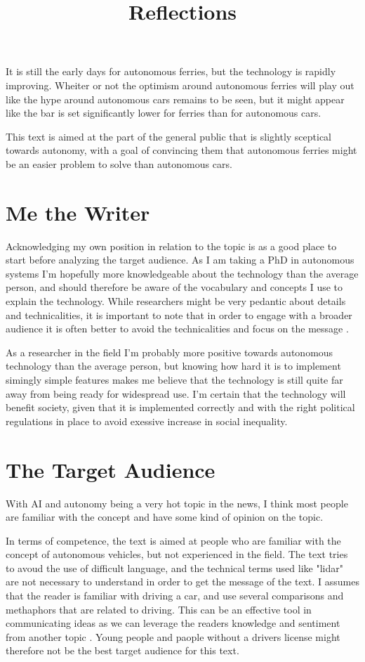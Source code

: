 \documentclass{iopconfser}
\begin{document}
It is still the early days for autonomous ferries, but the technology is rapidly improving. 
Wheiter or not the optimism around autonomous ferries will play out like the hype around autonomous cars remains to be seen, but it might appear like the bar is set significantly lower for ferries than for autonomous cars.


\newpage
\title{Reflections}
This text is aimed at the part of the general public that is slightly sceptical towards autonomy, with a goal of convincing them that autonomous ferries might be an easier problem to solve than autonomous cars.

\section*{Me the Writer}
Acknowledging my own position in relation to the topic is as a good place to start before analyzing the target audience.
As I am taking a PhD in autonomous systems I'm hopefully more knowledgeable about the technology than the average person, and should therefore be aware of the vocabulary and concepts I use to explain the technology.
While researchers might be very pedantic about details and technicalities, it is important to note that in order to engage with a broader audience it is often better to avoid the technicalities and focus on the message \cite{kulykPeopleWantReassurance2023}.

As a researcher in the field I'm probably more positive towards autonomous technology than the average person, but knowing how hard it is to implement simingly simple features makes me believe that the technology is still quite far away from being ready for widespread use.
I'm certain that the technology will benefit society, given that it is implemented correctly and with the right political regulations in place to avoid exessive increase in social inequality.

\section*{The Target Audience}
With AI and autonomy being a very hot topic in the news, I think most people are familiar with the concept and have some kind of opinion on the topic.

In terms of competence, the text is aimed at people who are familiar with the concept of autonomous vehicles, but not experienced in the field.
The text tries to avoud the use of difficult language, and the technical terms used like "lidar" are not necessary to understand in order to get the message of the text.
I assumes that the reader is familiar with driving a car, and use several comparisons and methaphors that are related to driving.
This can be an effective tool in communicating ideas as we can leverage the readers knowledge and sentiment from another topic \cite{gustafssonCognitiveLinguisticsScience2024}.
Young people and paople without a drivers license might therefore not be the best target audience for this text.
\end{document}
